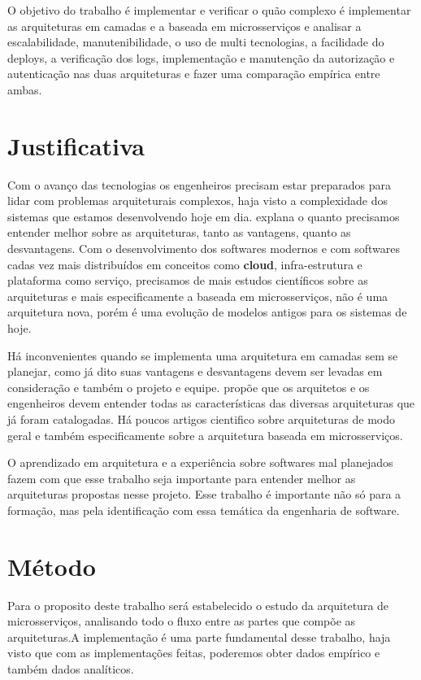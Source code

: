 O objetivo do trabalho é implementar e verificar o quão complexo é implementar as arquiteturas em camadas e a baseada em microsserviços e analisar a escalabilidade, manutenibilidade, o uso de multi tecnologias, a facilidade do deploys, a verificação dos logs, implementação e manutenção da autorização e autenticação nas duas arquiteturas e fazer uma comparação empírica entre ambas.

\section{Justificativa}

Com o avanço das tecnologias os engenheiros precisam estar preparados para lidar com problemas arquiteturais complexos, haja visto a complexidade dos sistemas que estamos desenvolvendo hoje em dia. \cite{Schmidt2018} explana o quanto precisamos entender melhor sobre as arquiteturas, tanto as vantagens, quanto as desvantagens. Com o desenvolvimento dos softwares modernos e com softwares cadas vez mais distribuídos em conceitos como \textbf{cloud}, infra-estrutura e plataforma como serviço, precisamos de mais estudos científicos sobre as arquiteturas e mais especificamente a baseada em microsserviços, não é uma arquitetura nova, porém é uma evolução de modelos antigos para os sistemas de hoje.

Há inconvenientes quando se implementa uma arquitetura em camadas sem se planejar, como já dito suas vantagens e desvantagens devem ser levadas em consideração e também o projeto e equipe. \cite{Schmidt2018} propõe que os arquitetos e os engenheiros devem entender todas as características das diversas arquiteturas que já foram catalogadas. Há poucos artigos cientifico sobre arquiteturas de modo geral e também especificamente sobre a arquitetura baseada em microsserviços.

O aprendizado em arquitetura e a experiência sobre softwares mal planejados fazem com que esse trabalho seja importante para entender melhor as arquiteturas propostas nesse projeto. Esse trabalho é importante não só para a formação, mas pela identificação com essa temática da engenharia de software.


\section{Método}

Para o proposito deste trabalho será estabelecido o estudo da arquitetura de microsserviços, analisando todo o fluxo entre as partes que compõe as arquiteturas.A implementação é uma parte fundamental desse trabalho, haja visto que com as implementações feitas, poderemos obter dados empírico e também dados analíticos.

